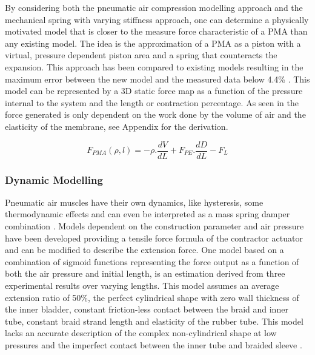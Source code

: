 \documentclass[11pt,a4paper]{article}
\begin{document}
By considering both the pneumatic air compression modelling approach and the mechanical spring with varying stiffness approach, one can determine a physically motivated model that is closer to the measure force characteristic of a PMA than any existing model. The idea is the approximation of a PMA as a piston with a virtual, pressure dependent piston area and a spring that counteracts the expansion. This approach has been compared to existing models resulting in the maximum error between the new model and the measured data below 4.4\% \cite{martens_boblan_2017}. This model can be represented by a 3D static force map  as a function of the pressure internal to the system and the length or contraction percentage. As seen in  the force generated is only dependent on the work done by the volume of air and the elasticity of the membrane, see Appendix  for the derivation.

\begin{equation}
F_{PMA}(\rho, l) = -\rho.\frac{dV}{dL}+F_{PE}.\frac{dD}{dL}-F_L
\label{math:staticforce}
\end{equation}

\subsubsection{Dynamic Modelling}
\label{sub:dynamic_modelling}
Pneumatic air muscles have their own dynamics, like hysteresis, some thermodynamic effects and can even be interpreted as a mass spring damper combination \cite{martens_boblan_2017}. Models dependent on the construction parameter and air pressure have been developed providing a tensile force formula of the contractor actuator and can be modified to describe the extension force. One model based on a combination of sigmoid functions representing the force output as a function of both the air pressure and initial length, is an estimation derived from three experimental results over varying lengths. This model assumes an average extension ratio of 50\%, the perfect cylindrical shape with zero wall thickness of the inner bladder, constant friction-less contact between the braid and inner tube, constant braid strand length and elasticity of the rubber tube. This model lacks an accurate description of the complex non-cylindrical shape at low pressures and the imperfect contact between the inner tube and braided sleeve \cite{al-ibadi_nefti-meziani_davis_2018}. \newline
\end{document}
